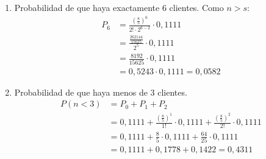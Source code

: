 \documentclass{templateNote}
\begin{document}
\begin{enumerate}
    \item Probabilidad de que haya exactamente 6 clientes.
    Como $n > s$:
    \begin{align*}
        P_6 &= \frac{\left(\frac{8}{5}\right)^6}{2! \cdot 2^{6-2}} \cdot 0,1111 \\
        &= \frac{\frac{262144}{15625}}{2^5} \cdot 0,1111 \\
        &= \frac{8192}{15625} \cdot 0,1111 \\
        &= 0,5243 \cdot 0,1111 = 0,0582
    \end{align*}

    \item Probabilidad de que haya menos de 3 clientes.
    \begin{align*}
        P(n < 3) &= P_0 + P_1 + P_2 \\
        &= 0,1111 + \frac{\left(\frac{8}{5}\right)^1}{1!} \cdot 0,1111 + \frac{\left(\frac{8}{5}\right)^2}{2!} \cdot 0,1111 \\
        &= 0,1111 + \frac{8}{5} \cdot 0,1111 + \frac{64}{25} \cdot 0,1111 \\
        &= 0,1111 + 0,1778 + 0,1422 = 0,4311
    \end{align*}
\end{enumerate}

\newpage
\end{document}
